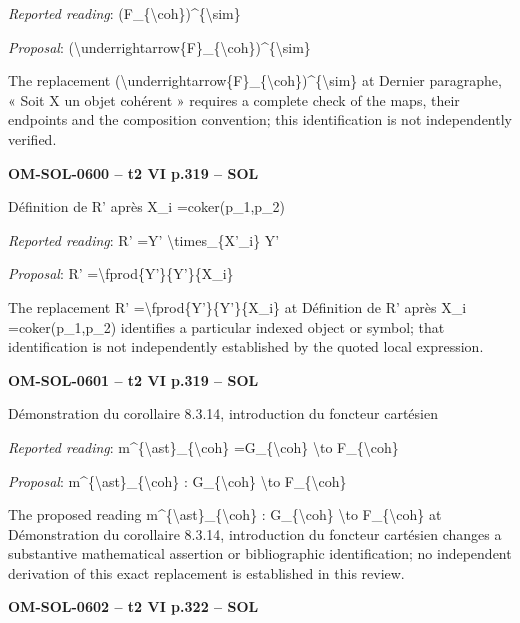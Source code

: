 \emph{Reported reading}: (F\_\{\textbackslash{}coh\})\textasciicircum{}\{\textbackslash{}sim\}\par
\emph{Proposal}: (\textbackslash{}underrightarrow\{F\}\_\{\textbackslash{}coh\})\textasciicircum{}\{\textbackslash{}sim\}\par
The replacement (\textbackslash{}underrightarrow\{F\}\_\{\textbackslash{}coh\})\textasciicircum{}\{\textbackslash{}sim\} at Dernier paragraphe, « Soit X un objet cohérent » requires a complete check of the maps, their endpoints and the composition convention; this identification is not independently verified.\par
\par\noindent\textbf{OM-SOL-0600 -- t2 VI p.319 -- SOL}\par
Définition de R' après X\_i =\allowbreak  coker(p\_1,p\_2)\par
\emph{Reported reading}: R' =\allowbreak  Y' \textbackslash{}times\_\{X'\_i\} Y'\par
\emph{Proposal}: R' =\allowbreak  \textbackslash{}fprod\{Y'\}\{Y'\}\{X\_i\}\par
The replacement R' =\allowbreak  \textbackslash{}fprod\{Y'\}\{Y'\}\{X\_i\} at Définition de R' après X\_i =\allowbreak  coker(p\_1,p\_2) identifies a particular indexed object or symbol; that identification is not independently established by the quoted local expression.\par
\par\noindent\textbf{OM-SOL-0601 -- t2 VI p.319 -- SOL}\par
Démonstration du corollaire 8.3.14, introduction du foncteur cartésien\par
\emph{Reported reading}: m\textasciicircum{}\{\textbackslash{}ast\}\_\{\textbackslash{}coh\} =\allowbreak  G\_\{\textbackslash{}coh\} \textbackslash{}to F\_\{\textbackslash{}coh\}\par
\emph{Proposal}: m\textasciicircum{}\{\textbackslash{}ast\}\_\{\textbackslash{}coh\} : G\_\{\textbackslash{}coh\} \textbackslash{}to F\_\{\textbackslash{}coh\}\par
The proposed reading m\textasciicircum{}\{\textbackslash{}ast\}\_\{\textbackslash{}coh\} : G\_\{\textbackslash{}coh\} \textbackslash{}to F\_\{\textbackslash{}coh\} at Démonstration du corollaire 8.3.14, introduction du foncteur cartésien changes a substantive mathematical assertion or bibliographic identification; no independent derivation of this exact replacement is established in this review.\par
\par\noindent\textbf{OM-SOL-0602 -- t2 VI p.322 -- SOL}\par
